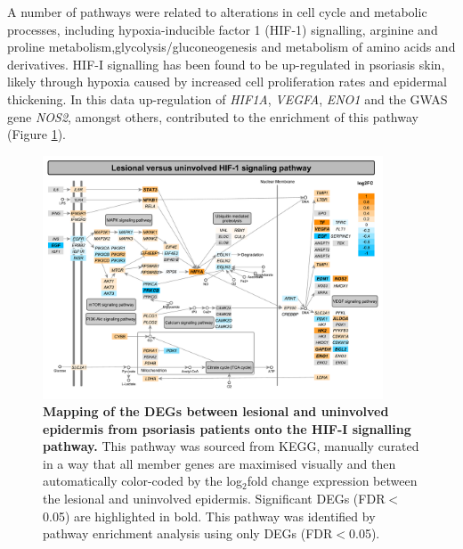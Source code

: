 A number of pathways were related to alterations in cell cycle and metabolic processes, including hypoxia-inducible factor 1 (HIF-1) signalling, arginine and proline metabolism,glycolysis/gluconeogenesis and metabolism of amino acids and derivatives. %
HIF-I signalling has been found to be up-regulated in psoriasis skin, likely through hypoxia caused by increased cell proliferation rates and epidermal thickening. In this data up-regulation of \textit{HIF1A}, \textit{VEGFA}, \textit{ENO1} and the GWAS gene \textit{NOS2}, amongst others, contributed to the enrichment of this pathway (Figure \ref{figure:PS_lesional_vs_uninvolved_HIF_pathway}). 

\begin{figure}[htbp]
\centering
\includegraphics[width=0.9\textwidth]{./Results2/pdfs/PS_lesional_uninvolved_all_HIF_1_pathway}
\caption[Mapping of the DEGs between lesional and uninvolved epidermis from psoriasis patients onto the HIF-I signalling pathway.]{\textbf{Mapping of the DEGs between lesional and uninvolved epidermis from psoriasis patients onto the HIF-I signalling pathway.} This pathway was sourced from KEGG, manually curated in a way that all member genes are maximised visually and then automatically color-coded by the log$_2$fold change expression between the lesional and uninvolved epidermis. Significant DEGs (FDR$<$0.05) are highlighted in bold. This pathway was identified by pathway enrichment analysis using only DEGs (FDR$<$0.05).}
\label{figure:PS_lesional_vs_uninvolved_HIF_pathway}
\end{figure}

